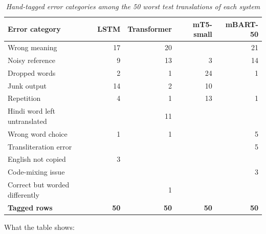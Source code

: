 \documentclass[11pt,a4paper]{article}
\begin{document}
\begin{table}[t]
\caption{\textit{Hand-tagged error categories among the 50 worst test translations of each system}}\label{tab:errors}
\centering\small
\begin{tabular}{lrrrr}
\hline\hline
\textbf{Error category} & \textbf{LSTM} & \textbf{Transformer} & \textbf{mT5-small} & \textbf{mBART-50} \\
\hline
Wrong meaning & 17 & 20 &  & 21 \\
Noisy reference & 9 & 13 & 3 & 14 \\
Dropped words & 2 & 1 & 24 & 1 \\
Junk output & 14 & 2 & 10 &  \\
Repetition & 4 & 1 & 13 & 1 \\
Hindi word left untranslated &  & 11 &  &  \\
Wrong word choice & 1 & 1 &  & 5 \\
Transliteration error &  &  &  & 5 \\
English not copied & 3 &  &  &  \\
Code-mixing issue &  &  &  & 3 \\
Correct but worded differently &  & 1 &  &  \\
\textbf{Tagged rows} & \textbf{50} & \textbf{50} & \textbf{50} & \textbf{50} \\
\hline\hline
\end{tabular}
\end{table}
\noindent What the table shows:
\end{document}
